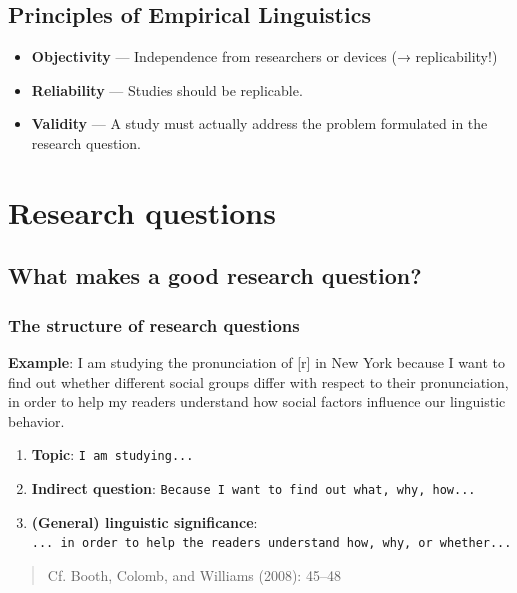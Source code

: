 \documentclass[
  11pt,
  letterpaper,
  DIV=11,
  numbers=noendperiod]{scrreprt}
\begin{document}
\section{Principles of Empirical
Linguistics}\label{principles-of-empirical-linguistics}

\begin{itemize}
\item
  \textbf{Objectivity} --- Independence from researchers or devices (→
  replicability!)
\item
  \textbf{Reliability} --- Studies should be replicable.
\item
  \textbf{Validity} --- A study must actually address the problem
  formulated in the research question.
\end{itemize}

\chapter{Research questions}\label{research-questions}

\section{What makes a good research
question?}\label{what-makes-a-good-research-question}

\subsection{The structure of research
questions}\label{the-structure-of-research-questions}

\textbf{Example}: I am studying the pronunciation of {[}r{]} in New York
because I want to find out whether different social groups differ with
respect to their pronunciation, in order to help my readers understand
how social factors influence our linguistic behavior.

\begin{enumerate}
\def\labelenumi{\arabic{enumi}.}
\item
  \textbf{Topic}: \texttt{I\ am\ studying...}
\item
  \textbf{Indirect question}:
  \texttt{Because\ I\ want\ to\ find\ out\ what,\ why,\ how...}
\item
  \textbf{(General) linguistic significance}:
  \texttt{...\ in\ order\ to\ help\ the\ readers\ understand\ how,\ why,\ or\ whether...}
\end{enumerate}

\begin{quote}
Cf. Booth, Colomb, and Williams (2008): 45--48
\end{quote}
\end{document}
